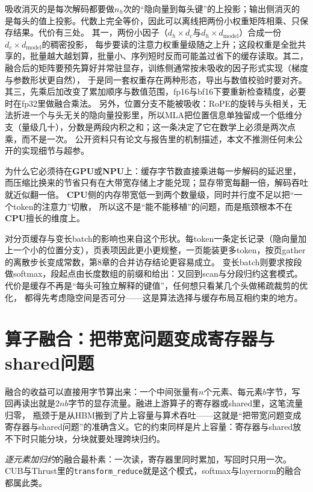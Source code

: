 \documentclass[12pt,a4paper,fontset=fandol]{ctexbook}
\newcommand{\Tp}[1]{\texttt{#1}}
\newcommand{\Dom}[1]{\textsf{\bfseries #1}}
\newcommand{\CPU}{\Dom{CPU}}
\newcommand{\GPU}{\Dom{GPU}}
\newcommand{\NPU}{\Dom{NPU}}
\begin{document}
\begin{note}[title={吸收到底吸收了哪一步，代价是什么}]
吸收消灭的是每次解码都要做$n_h$次的``隐向量到每头键''的上投影；输出侧消灭的是每头的值上投影。代数上完全等价，因此可以离线把两份小权重矩阵相乘、只保存结果。代价有三处。
其一，两份小因子（$d_h\times d_c$与$d_h\times d_{\text{model}}$）合成一份$d_c\times d_{\text{model}}$的稠密投影，
每步要读的注意力权重量级随之上升；这段权重是全批共享的，批量越大越划算，批量小、序列短时反而可能盖过省下的缓存读取。其二，融合后的矩阵要预先算好并常驻显存，训练侧通常按未吸收的因子形式实现（梯度与参数形状更自然），
于是同一套权重存在两种形态，导出与数值校验时要对齐。其三，先乘后加改变了累加顺序与数值范围，fp16与bf16下要重新检查精度，必要时在fp32里做融合乘法。
另外，位置分支不能被吸收：RoPE的旋转与头相关，无法折进一个与头无关的隐向量投影里，所以MLA把位置信息单独留成一个低维分支（量级几十），分数是两段内积之和；这一条决定了它在数学上必须是两次点乘，而不是一次。
公开资料只有论文与报告里的机制描述，本文不推测任何未公开的实现细节与超参。
\end{note}

为什么它必须待在\GPU{}或\NPU{}上：缓存字节数直接乘进每一步解码的延迟里，而压缩比换来的节省只有在大带宽存储上才能兑现；显存带宽每翻一倍，解码吞吐就近似翻一倍。
\CPU{}侧的内存带宽低一到两个数量级，同时并行度不足以把``一个token的注意力''切散，
所以这不是``能不能移植''的问题，而是瓶颈根本不在\CPU{}擅长的维度上。

对分页缓存与变长batch的影响也来自这个形状。每token一条定长记录（隐向量加上一个小的位置分支），页表项因此更小更规整，一页能装更多token，按页gather的离散步长变成常数，第8章的合并访存结论更容易成立。
变长batch则要求按段做softmax，段起点由长度数组的前缀和给出：又回到scan与分段归约这套模式。代价是缓存不再是``每头可独立解释的键值''，任何想只看某几个头做稀疏裁剪的优化，
都得先考虑隐空间是否可分——这是算法选择与缓存布局互相约束的地方。

\section{算子融合：把带宽问题变成寄存器与shared问题}

融合的收益可以直接用字节算出来：一个中间张量有$n$个元素、每元素$b$字节，写回再读出就是$2nb$字节的显存流量。融进上游算子的寄存器或shared里，这笔流量归零，
瓶颈于是从HBM搬到了片上容量与算术吞吐——这就是``把带宽问题变成寄存器与shared问题''的准确含义。它的约束同样是片上容量：寄存器与shared放不下时只能分块，分块就要处理跨块归约。

\emph{逐元素加归约}的融合最朴素：一次读，寄存器里同时累加，写回时只用一次。
CUB与Thrust里的\Tp{transform\_reduce}就是这个模式，softmax与layernorm的融合都属此类。
\end{document}
